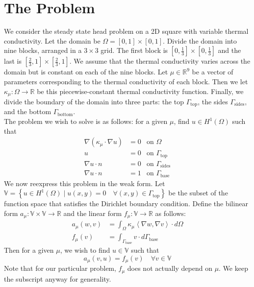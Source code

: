 \documentclass[11pt]{article}
\newcommand{\R}{\mathbb{R}}
\newcommand{\inner}[1]{\left \langle #1 \right \rangle}
\newcommand{\set}[1]{\left \{ #1 \right \}}
\begin{document}
\section{The Problem}
We consider the steady state head problem on a 2D square with variable
thermal conductivity.
Let the domain be $\Omega = [0, 1] \times [0, 1]$.
Divide the domain into nine blocks, arranged in a $3\times 3$ grid.
The first block is $[0, \frac13] \times [0, \frac13]$ and the last is $[\frac23, 1] \times [\frac23, 1]$.
We assume that the thermal conductivity varies across the domain but is constant on each of the nine blocks.
Let $\mu \in \R^9$ be a vector of parameters corresponding to the thermal conductivity of each block.
Then we let $\kappa_{\mu} : \Omega \to \R$ be this piecewise-constant thermal conductivity function.
Finally, we divide the boundary of the domain into three parts: the top $\Gamma_{\mathrm{top}}$, the sides $\Gamma_{\mathrm{sides}}$,
and the bottom $\Gamma_{\mathrm{bottom}}$.\\

The problem we wish to solve is as follows: for a given $\mu$, find $u \in H^1(\Omega)$ such that
\begin{align*}
    \nabla(\kappa_{\mu} \cdot \nabla u) &= 0 &\text{on } \Omega\\
    u &= 0 &\text{on } \Gamma_{\mathrm{top}}\\
    \nabla u \cdot n &= 0 &\text{on } \Gamma_{\mathrm{sides}}\\
    \nabla u \cdot n &= 1 &\text{on } \Gamma_{\mathrm{base}}
\end{align*}
We now reexpress this problem in the weak form.
Let $\mathbb V = \set{u \in H^1(\Omega) \mid u(x, y) = 0 \quad \forall (x, y) \in \Gamma_{\mathrm{top}}}$
be the subset of the function space that satisfies the Dirichlet boundary condition.
Define the bilinear form $a_{\mu}: \mathbb V \times \mathbb V \to \R$
and the linear form $f_{\mu} : \mathbb V \to \R$ as follows:
\begin{align*}
    a_{\mu}(w, v) &= \int_{\Omega} \kappa_{\mu} \inner{\nabla w, \nabla v} \cdot d\Omega\\
    f_{\mu}(v) &= \int_{\Gamma_{\mathrm{base}}} v \cdot d\Gamma_{\mathrm{base}}
\end{align*}
Then for a given $\mu$, we wish to find $u \in \mathbb V$ such that
\begin{equation}\label{eq:inf_dim}
    a_{\mu}(v, u) = f_{\mu}(v) \quad \forall v \in \mathbb V
\end{equation}
Note that for our particular problem, $f_{\mu}$ does not actually depend on $\mu$.
We keep the subscript anyway for generality.
\end{document}
